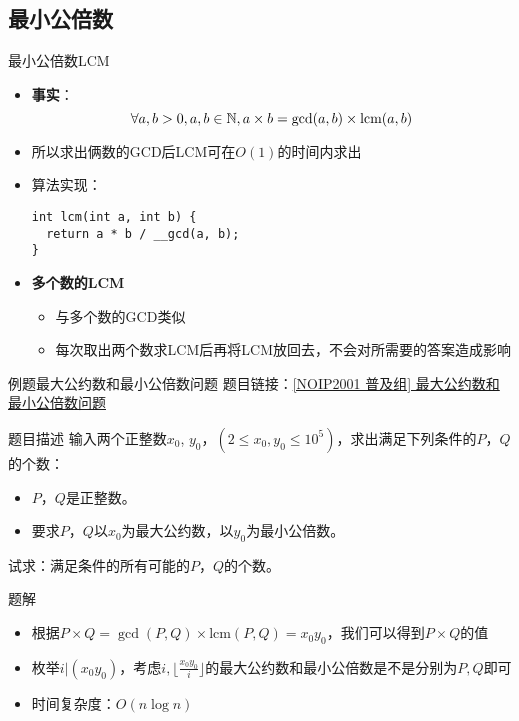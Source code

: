 \subsection{最小公倍数}
\begin{frame}[fragile]{最小公倍数}{LCM}
  \begin{itemize}
    \item \textbf{事实}：
    $$\forall a,b>0,a,b\in \mathbb{N}, a\times b=\gcd(a,b)\times \text{lcm}(a,b)$$
    \item 所以求出俩数的GCD后LCM可在$O(1)$的时间内求出
    \pause
    \item 算法实现：
    \begin{lstlisting}
int lcm(int a, int b) {
  return a * b / __gcd(a, b);
}
    \end{lstlisting}
    \pause
    \item \textbf{多个数的LCM}
    \begin{itemize}
      \item 与多个数的GCD类似
      \pause
      \item 每次取出两个数求LCM后再将LCM放回去，不会对所需要的答案造成影响
    \end{itemize}
  \end{itemize}
\end{frame}

\begin{frame}{例题}{最大公约数和最小公倍数问题}
  题目链接：\href{https://www.luogu.com.cn/problem/P1029}{[NOIP2001 普及组] 最大公约数和最小公倍数问题}
  \begin{block}{题目描述}
    输入两个正整数$x_0$, $y_0$，$(2\leq x_0,y_0\leq 10^5)$，求出满足下列条件的$P$，$Q$的个数：
    \begin{itemize}
      \item $P$，$Q$是正整数。
      \item 要求$P$，$Q$以$x_0$为最大公约数，以$y_0$为最小公倍数。
    \end{itemize}
    试求：满足条件的所有可能的$P$，$Q$的个数。
  \end{block}
  \vspace{0.3cm}
  \pause
  \begin{exampleblock}{题解}
    \begin{itemize}
      \item 根据$P\times Q=\gcd(P,Q)\times \text{lcm}(P,Q)=x_0y_0$，我们可以得到$P\times Q$的值
      \item 枚举$i|(x_0y_0)$，考虑$i,\lfloor \frac{x_0y_0}{i} \rfloor$的最大公约数和最小公倍数是不是分别为$P,Q$即可
      \pause
      \item 时间复杂度：$O(n\log{n})$
    \end{itemize}
  \end{exampleblock}
\end{frame}

